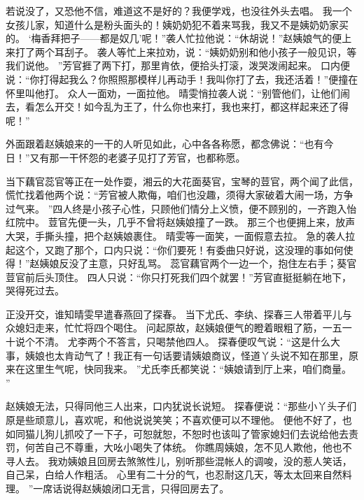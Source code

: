 若说没了，又恐他不信，难道这不是好的？我便学戏，也没往外头去唱。
我一个女孩儿家，知道什么是粉头面头的！姨奶奶犯不着来骂我，我又不是姨奶奶家买的。
‘梅香拜把子——都是奴几’呢！”袭人忙拉他说：“休胡说！”赵姨娘气的便上来打了两个耳刮子。
袭人等忙上来拉劝，说：“姨奶奶别和他小孩子一般见识，等我们说他。
”芳官捱了两下打，那里肯依，便拾头打滚，泼哭泼闹起来。
口内便说：“你打得起我么？你照照那模样儿再动手！我叫你打了去，我还活着！”便撞在怀里叫他打。
众人一面劝，一面拉他。
晴雯悄拉袭人说：“别管他们，让他们闹去，看怎么开交！如今乱为王了，什么你也来打，我也来打，都这样起来还了得呢！”\par
外面跟着赵姨娘来的一干的人听见如此，心中各各称愿，都念佛说：“也有今日！”又有那一干怀怨的老婆子见打了芳官，也都称愿。
\par
当下藕官蕊官等正在一处作耍，湘云的大花面葵官，宝琴的荳官，两个闻了此信，慌忙找着他两个说：“芳官被人欺侮，咱们也没趣，须得大家破着大闹一场，方争过气来。
”四人终是小孩子心性，只顾他们情分上义愤，便不顾别的，一齐跑入怡红院中。
荳官先便一头，几乎不曾将赵姨娘撞了一跌。
那三个也便拥上来，放声大哭，手撕头撞，把个赵姨娘裹住。
晴雯等一面笑，一面假意去拉。
急的袭人拉起这个，又跑了那个，口内只说：“你们要死！有委曲只好说，这没理的事如何使得！”赵姨娘反没了主意，只好乱骂。
蕊官藕官两个一边一个，抱住左右手；葵官荳官前后头顶住。
四人只说：“你只打死我们四个就罢！”芳官直挺挺躺在地下，哭得死过去。
\par
正没开交，谁知晴雯早遣春燕回了探春。
当下尤氏、李纨、探春三人带着平儿与众媳妇走来，忙忙将四个喝住。
问起原故，赵姨娘便气的瞪着眼粗了筋，一五一十说个不清。
尤李两个不答言，只喝禁他四人。
探春便叹气说：“这是什么大事，姨娘也太肯动气了！我正有一句话要请姨娘商议，怪道丫头说不知在那里，原来在这里生气呢，快同我来。
”尤氏李氏都笑说：“姨娘请到厅上来，咱们商量。
”\par
赵姨娘无法，只得同他三人出来，口内犹说长说短。
探春便说：“那些小丫头子们原是些顽意儿，喜欢呢，和他说说笑笑；不喜欢便可以不理他。
便他不好了，也如同猫儿狗儿抓咬了一下子，可恕就恕，不恕时也该叫了管家媳妇们去说给他去责罚，何苦自己不尊重，大吆小喝失了体统。
你瞧周姨娘，怎不见人欺他，他也不寻人去。
我劝姨娘且回房去煞煞性儿，别听那些混帐人的调唆，没的惹人笑话，自己呆，白给人作粗活。
心里有二十分的气，也忍耐这几天，等太太回来自然料理。
”一席话说得赵姨娘闭口无言，只得回房去了。
